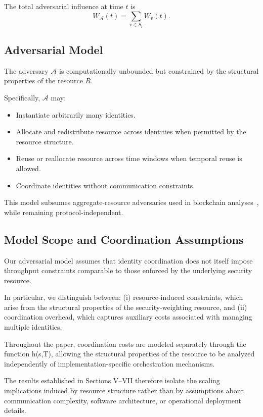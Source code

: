 \documentclass[journal]{IEEEtran}
\begin{document}
	The total adversarial influence at time $t$ is
	\[
	W_{\mathcal{A}}(t) = \sum_{v \in S_t} W_v(t).
	\]
	
	\subsection{Adversarial Model}
	
	The adversary $\mathcal{A}$ is computationally unbounded
	but constrained by the structural properties of the resource $R$.
	
	Specifically, $\mathcal{A}$ may:
	
	\begin{itemize}
		\item Instantiate arbitrarily many identities.
		\item Allocate and redistribute resource across identities
		when permitted by the resource structure.
		\item Reuse or reallocate resource across time windows
		when temporal reuse is allowed.
		\item Coordinate identities without communication constraints.
	\end{itemize}
	
	This model subsumes aggregate-resource adversaries
	used in blockchain analyses~\cite{garay2015backbone,kiayias2017ouroboros},
	while remaining protocol-independent.
	
	\subsection{Model Scope and Coordination Assumptions}
	
	Our adversarial model assumes that identity coordination
	does not itself impose throughput constraints comparable to
	those enforced by the underlying security resource.
	
	In particular, we distinguish between:
	(i) resource-induced constraints, which arise from the
	structural properties of the security-weighting resource, and
	(ii) coordination overhead, which captures auxiliary costs
	associated with managing multiple identities.
	
	Throughout the paper, coordination costs are modeled
	separately through the function h(s,T), allowing the structural
	properties of the resource to be analyzed independently of
	implementation-specific orchestration mechanisms.
	
	The results established in Sections V--VII therefore isolate
	the scaling implications induced by resource structure rather
	than by assumptions about communication complexity,
	software architecture, or operational deployment details.
	
\end{document}
